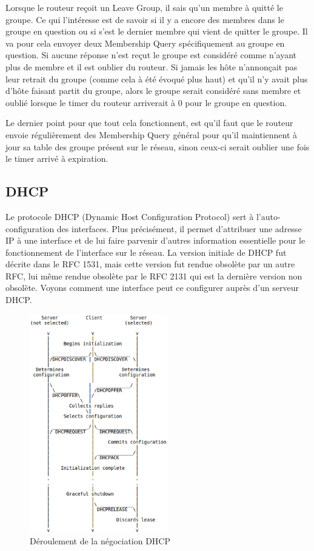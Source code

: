 Lorsque le routeur reçoit un Leave Group, il sais qu'un membre à quitté le
groupe. Ce qui l'intéresse est de savoir si il y a encore des membres dans le
groupe en question ou si s'est le dernier membre qui vient de quitter le
groupe. Il va pour cela envoyer deux Membership Query spécifiquement au groupe
en question. Si aucune réponse n'est reçut le groupe est considéré comme
n'ayant plus de membre et il est oublier du routeur.  Si jamais les hôte
n'annonçait pas leur retrait du groupe (comme cela à été évoqué plus haut) et
qu'il n'y avait plus d'hôte faisant partit du groupe, alors le groupe serait
considéré sans membre et oublié lorsque le timer du routeur arriverait à 0 pour
le groupe en question.

\smallbreak
Le dernier point pour que tout cela fonctionnent, est qu'il faut que le routeur
envoie régulièrement des Membership Query général pour qu'il maintiennent à
jour sa table des groupe présent sur le réseau, sinon ceux-ci serait oublier
une fois le timer arrivé à expiration.



\subsection{DHCP}
Le protocole DHCP (Dynamic Host Configuration Protocol) sert à l'auto-configuration
des interfaces. Plus précisément, il  permet d'attribuer une adresse IP à une
interface et de lui faire parvenir d'autres information essentielle pour le
fonctionnement de l'interface sur le réseau. La version initiale de DHCP fut décrite
dans le RFC 1531\cite{url-RFC-DHCP1}, mais cette version fut rendue obsolète par un autre
RFC, lui même rendue obsolète par le RFC 2131\cite{url-RFC-DHCP2} qui est la dernière version non
obsolète. Voyons comment une interface peut ce configurer auprès d'un serveur DHCP.

\begin{figure}[h]
\centering
\includegraphics[width=6cm]{./pics/timeline_dhcp.eps}
\caption{Déroulement de la négociation DHCP}
\label{fig:timelinedhcp}
\end{figure}

